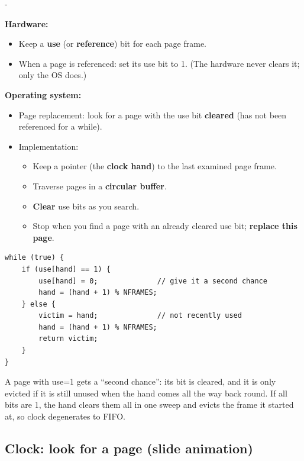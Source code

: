 \documentclass[11pt,a4paper]{article}
\makeatletter
\newcommand{\keepspace}[1]{\par\penalty-100\begingroup
  \setlength{\dimen@}{#1}\dimen@ii\pagegoal\advance\dimen@ii-\pagetotal
  \ifdim\dimen@>\dimen@ii\ifdim\dimen@ii>\z@\vfil\fi\break\fi\endgroup}
\makeatother
\begin{document}
\keepspace{18\baselineskip}
\begin{defbox}
\textbf{Hardware:}
\begin{itemize}
  \item Keep a \textbf{use} (or \textbf{reference}) bit for each page frame.
  \item When a page is referenced: set its use bit to 1. (The hardware never
        clears it; only the OS does.)
\end{itemize}
\textbf{Operating system:}
\begin{itemize}
  \item Page replacement: look for a page with the use bit
        \textbf{cleared} (has not been referenced for a while).
  \item Implementation:
        \begin{itemize}
          \item Keep a pointer (the \textbf{clock hand}) to the last
                examined page frame.
          \item Traverse pages in a \textbf{circular buffer}.
          \item \textbf{Clear} use bits as you search.
          \item Stop when you find a page with an already cleared use bit;
                \textbf{replace this page}.
        \end{itemize}
\end{itemize}
\end{defbox}

\begin{verbatim}
while (true) {
    if (use[hand] == 1) {
        use[hand] = 0;              // give it a second chance
        hand = (hand + 1) % NFRAMES;
    } else {
        victim = hand;              // not recently used
        hand = (hand + 1) % NFRAMES;
        return victim;
    }
}
\end{verbatim}

A page with use=1 gets a ``second chance'': its bit is cleared, and it is
only evicted if it is still unused when the hand comes all the way back
round. If all bits are 1, the hand clears them all in one sweep and
evicts the frame it started at, so clock degenerates to FIFO.

\subsection{Clock: look for a page (slide animation)}
\end{document}
